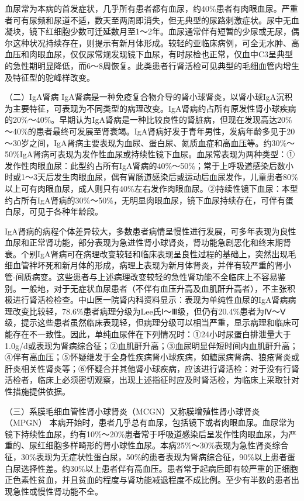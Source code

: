血尿常为本病的首发症状，几乎所有患者都有血尿，约40\%患者有肉眼血尿。严重者可有尿频和尿道不适，数天至两周即消失，但无典型的尿路刺激症状。尿中无血凝块，镜下红细胞少数可迁延数月至1～2年。血尿通常伴有短暂的少尿或无尿，偶尔这种状况持续存在，则提示有新月体形成。较轻的亚临床病例，可全无水肿、高血压和肉眼血尿，仅仅尿常规发现镜下血尿，有时尿检也正常，仅血中C3呈典型的急性期明显降低，而6～8周恢复。此类患者行肾活检可见典型的毛细血管内增生及特征型的驼峰样改变。

（二）IgA肾病
IgA肾病是一种免疫复合物介导的肾小球肾炎，以肾小球IgA沉积为主要特征，可表现为不同类型的病理改变。IgA肾病约占所有原发性肾小球疾病的20\%～40\%。早期认为IgA肾病是一种比较良性的肾脏病，但现在发现高达20\%～40\%的患者最终可发展至肾衰竭。IgA肾病好发于青年男性，发病年龄多见于20～30岁之间，IgA肾病主要表现为血尿、蛋白尿、氮质血症和高血压等。约30\%～50\%IgA肾病可表现为发作性血尿或持续性镜下血尿。血尿常表现为两种类型：①发作性肉眼血尿：此型约占所有IgA肾病的40\%～50\%；常于上呼吸道感染后数小时或1～3天后发生肉眼血尿，偶有胃肠道感染后或运动后血尿发作，儿童患者80\%以上可有肉眼血尿，成人则只有40\%左右发作肉眼血尿。②持续性镜下血尿：本型约占所有IgA肾病的30\%～50\%，无明显肉眼血尿，镜下血尿持续存在，可伴有蛋白尿，可见于各种年龄段。

IgA肾病的病程个体差异较大，多数患者病情呈慢性进行发展，可多年表现为良性血尿和正常肾功能，部分表现为急进性肾小球肾炎，肾功能急剧恶化和终末期肾衰。个别IgA肾病可在病理改变较轻和临床表现呈良性过程的基础上，突然出现毛细血管袢坏死和新月体的形成，病理上表现为新月体肾炎，并伴有较严重的肾小管-间质病变。这些患者与上述病理改变较轻的急性肾功能不全临床上不容易鉴别。一般地，对于无症状血尿患者（不伴有血压升高及血肌酐升高者），不主张积极进行肾活检检查。中山医一院肾内科资料显示：表现为单纯性血尿的IgA肾病病理改变比较轻，78.6\%患者病理分级为Lee氏Ⅰ～Ⅲ级，但仍有20.4\%患者为Ⅳ～Ⅴ级，提示这些患者虽然临床表现轻，但病理分级可以相当严重，显示病理和临床可能存在不一致性。因此，单纯血尿伴在下列情况时：①24小时尿蛋白排泄量大于1.0g/d或表现为肾病综合征；②血肌酐升高；③血尿明显伴短时间内血肌酐升高；④伴有高血压；⑤怀疑继发于全身性疾病肾小球疾病，如糖尿病肾病、狼疮肾炎或肝炎相关性肾炎等；⑥怀疑合并其他肾小球疾病，应该进行肾活检：对于没有行肾活检者，临床上必须密切观察，出现上述指征时应及时肾活检，为临床上采取针对性措施提供依据。

（三）系膜毛细血管性肾小球肾炎（MCGN）又称膜增殖性肾小球肾炎（MPGN）
本病开始时，患者几乎总有血尿，包括镜下或者肉眼血尿。血尿常为镜下持续性血尿，约有10\%～20\%患者常于呼吸道感染后呈发作性肉眼血尿，为严重的、尿红细胞多样畸形的肾小球性血尿。本病25\%～30\%表现为急性肾炎综合征，30\%表现为无症状性蛋白尿，50\%的患者表现为肾病综合征，90\%以上患者蛋白尿选择性差。约30\%以上患者伴有高血压。患者常于起病后即有较严重的正细胞正色素性贫血，并且贫血的程度与肾功能减退程度不成比例。至少有半数的患者出现急性或慢性肾功能不全。

